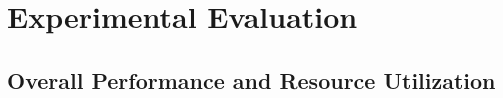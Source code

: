 %
\chapter{Experimental Evaluation}
\label{chap:evaluation}

\section{Overall Performance and Resource Utilization}
\label{sec:overall}
%
%

